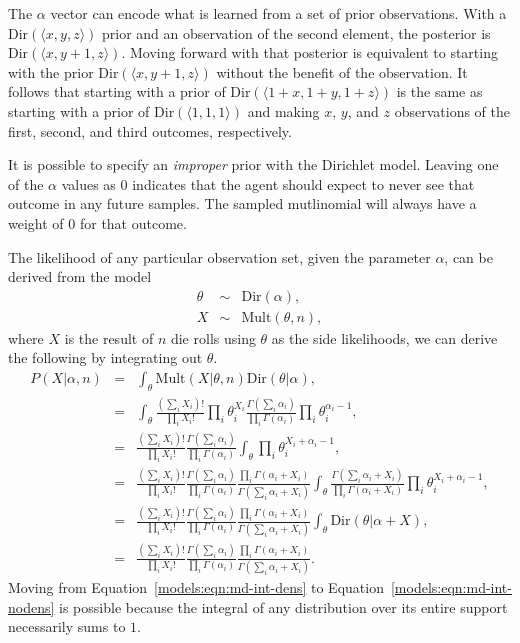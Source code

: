 The $\alpha$ vector can encode what is learned from a set of prior observations. With a $\mbox{Dir}(\langle x, y, z \rangle)$ prior and an observation of the second element, the posterior is $\mbox{Dir}(\langle x, y+1, z \rangle)$. Moving forward with that posterior is equivalent to starting with the prior $\mbox{Dir}(\langle x, y+1, z \rangle)$ without the benefit of the observation. It follows that starting with a prior of $\mbox{Dir}(\langle 1+x, 1+y, 1+z \rangle)$ is the same as starting with a prior of $\mbox{Dir}(\langle 1, 1, 1 \rangle)$ and making $x$, $y$, and $z$ observations of the first, second, and third outcomes, respectively.

It is possible to specify an \emph{improper} prior with the Dirichlet model. Leaving one of the $\alpha$ values as $0$ indicates that the agent should expect to never see that outcome in any future samples. The sampled mutlinomial will always have a weight of $0$ for that outcome.

The likelihood of any particular observation set, given the parameter $\alpha$, can be derived from the model
\begin{eqnarray}
\theta &\sim& \mbox{Dir}(\alpha),\\
X &\sim& \mbox{Mult}(\theta, n),
\end{eqnarray}
where $X$ is the result of $n$ die rolls using $\theta$ as the side likelihoods, we can derive the following by integrating out $\theta$.
\begin{eqnarray}
P(X|\alpha, n) &=& \int_\theta \mbox{Mult}(X|\theta,n) \mbox{Dir}(\theta|\alpha),\\
&=& \int_\theta \frac{\left(\sum_i X_i\right)!}{\prod_i X_i!} \prod_i\theta_i^{X_i} \frac{\Gamma\left(\sum_i \alpha_i\right)}{\prod_i \Gamma(\alpha_i)} \prod_i\theta_i^{\alpha_i-1},\\
&=& \frac{\left(\sum_i X_i\right)!}{\prod_i X_i!} \frac{\Gamma\left(\sum_i \alpha_i\right)} {\prod_i \Gamma(\alpha_i)}\int_\theta \prod_i\theta_i^{X_i+\alpha_i-1},\\
&=& \frac{\left(\sum_i X_i\right)!}{\prod_i X_i!} \frac{\Gamma\left(\sum_i \alpha_i\right)} {\prod_i \Gamma(\alpha_i)} \frac {\prod_i \Gamma(\alpha_i+X_i)} {\Gamma\left(\sum_i \alpha_i+X_i\right)} \int_\theta \frac{\Gamma\left(\sum_i \alpha_i+X_i\right)} {\prod_i \Gamma(\alpha_i+X_i)}  \prod_i\theta_i^{X_i+\alpha_i-1},\\
\label{models:eqn:md-int-dens}&=& \frac{\left(\sum_i X_i\right)!}{\prod_i X_i!} \frac{\Gamma\left(\sum_i \alpha_i\right)} {\prod_i \Gamma(\alpha_i)} \frac {\prod_i \Gamma(\alpha_i+X_i)} {\Gamma\left(\sum_i \alpha_i+X_i\right)} \int_\theta \mbox{Dir}(\theta|\alpha+X),\\
\label{models:eqn:md-int-nodens}&=& \frac{\left(\sum_i X_i\right)!}{\prod_i X_i!} \frac{\Gamma\left(\sum_i \alpha_i\right)} {\prod_i \Gamma(\alpha_i)} \frac {\prod_i \Gamma(\alpha_i+X_i)} {\Gamma\left(\sum_i \alpha_i+X_i\right)}.
\end{eqnarray}
Moving from Equation~\ref{models:eqn:md-int-dens} to Equation~\ref{models:eqn:md-int-nodens} is possible because the integral of any distribution over its entire support necessarily sums to $1$.



